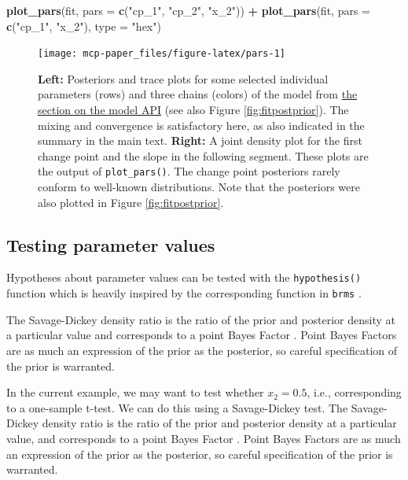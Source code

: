 \documentclass[
  american,
]{article}
\newenvironment{Shaded}{\begin{snugshade}}{\end{snugshade}}
\newcommand{\DataTypeTok}[1]{\textcolor[rgb]{0.13,0.29,0.53}{#1}}
\newcommand{\KeywordTok}[1]{\textcolor[rgb]{0.13,0.29,0.53}{\textbf{#1}}}
\newcommand{\NormalTok}[1]{#1}
\newcommand{\OperatorTok}[1]{\textcolor[rgb]{0.81,0.36,0.00}{\textbf{#1}}}
\newcommand{\StringTok}[1]{\textcolor[rgb]{0.31,0.60,0.02}{#1}}
\begin{document}
\begin{Shaded}
\begin{Highlighting}[]
\KeywordTok{plot_pars}\NormalTok{(fit, }\DataTypeTok{pars =} \KeywordTok{c}\NormalTok{(}\StringTok{"cp_1"}\NormalTok{, }\StringTok{"cp_2"}\NormalTok{, }\StringTok{"x_2"}\NormalTok{)) }\OperatorTok{+}\StringTok{ }
\StringTok{  }\KeywordTok{plot_pars}\NormalTok{(fit, }\DataTypeTok{pars =} \KeywordTok{c}\NormalTok{(}\StringTok{"cp_1"}\NormalTok{, }\StringTok{"x_2"}\NormalTok{), }\DataTypeTok{type =} \StringTok{"hex"}\NormalTok{)}
\end{Highlighting}
\end{Shaded}

\begin{figure}
\texttt{[image: mcp-paper\_files/figure-latex/pars-1]} \caption{\textbf{Left:} Posteriors and trace plots for some selected individual parameters (rows) and three chains (colors) of the model from \protect\hyperlink{segments_api}{the section on the model API} (see also Figure \ref{fig:fitpostprior}). The mixing and convergence is satisfactory here, as also indicated in the summary in the main text. \textbf{Right:} A joint density plot for the first change point and the slope in the following segment. These plots are the output of \texttt{plot\_pars()}. The change point posteriors rarely conform to well-known distributions. Note that the posteriors were also plotted in Figure \ref{fig:fitpostprior}.}\label{fig:pars}
\end{figure}



\hypertarget{testing-parameter-values}{%
\subsection{Testing parameter values}\label{testing-parameter-values}}

Hypotheses about parameter values can be tested with the \texttt{hypothesis()} function which is heavily inspired by the corresponding function in \texttt{brms} \citep{burkner2017}.

The Savage-Dickey density ratio is the ratio of the prior and posterior density at a particular value and corresponds to a point Bayes Factor \citep{verdinelli1995}. Point Bayes Factors are as much an expression of the prior as the posterior, so careful specification of the prior is warranted.

In the current example, we may want to test whether \(x_2 = 0.5\), i.e., corresponding to a one-sample t-test. We can do this using a Savage-Dickey test. The Savage-Dickey density ratio is the ratio of the prior and posterior density at a particular value, and corresponds to a point Bayes Factor \citep{verdinelli1995}. Point Bayes Factors are as much an expression of the prior as the posterior, so careful specification of the prior is warranted.
\end{document}
